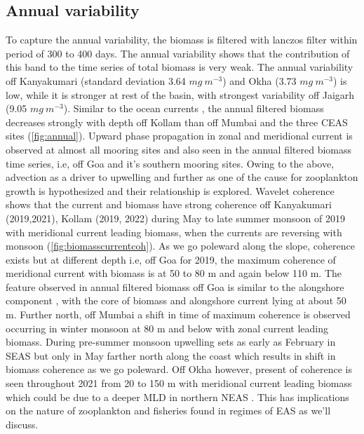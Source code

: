 \documentclass{article}
\begin{document}
	\subsection{Annual variability}
	To capture the annual variability, the biomass is filtered with lanczos filter within period of 300 to 400 days. The annual variability shows that the contribution of this band to the time series of total biomass is very weak. The annual variability off Kanyakumari (standard deviation 3.64 $mg\ m^{-3}$) and Okha (3.73 $mg\ m^{-3}$) is low, while it is stronger at rest of the basin, with strongest variability off Jaigarh (9.05 $mg\ m^{-3}$). Similar to the ocean currents \citep{amol2014observed, chaudhuri2020observed}, the annual filtered biomass decreases strongly with depth off Kollam than off Mumbai and the three CEAS sites (\cref{fig:annual}). Upward phase propagation in zonal and meridional current is observed at almost all mooring sites and also seen in the annual filtered biomass time series, i.e, off Goa and it's southern mooring sites. Owing to the above, advection as a driver to upwelling and further as one of the cause for zooplankton growth is hypothesized and their relationship is explored. Wavelet coherence shows that the current and biomass have strong coherence off Kanyakumari (2019,2021), Kollam (2019, 2022) during May to late summer monsoon of 2019 with meridional current leading biomass, when the currents are reversing with monsoon (\cref{fig:biomasscurrentcoh}). As we go poleward along the slope, coherence exists but at different depth i.e, off Goa for 2019, the maximum coherence of meridional current with biomass is at 50 to 80 m and again below 110 m. The feature observed in annual filtered biomass off Goa is similar to the alongshore component \citep{nethery2007zm}, with the core of biomass and alongshore current lying at about 50 m. Further north, off Mumbai a shift in time of maximum coherence is observed occurring in winter monsoon at 80 m and below with zonal current leading biomass. During pre-summer monsoon upwelling sets as early as February in SEAS but only in May farther north along the coast \citep{banse1968hydrography,} which results in shift in biomass coherence as we go poleward. Off Okha however,  present of coherence is seen throughout 2021 from 20 to 150 m with meridional current leading biomass which could be due to a deeper MLD in northern NEAS \citep{marra2005jgofs,shankar2016inhibition}. This has implications on the nature of zooplankton and fisheries found in regimes of EAS as we'll discuss.
	
\end{document}
